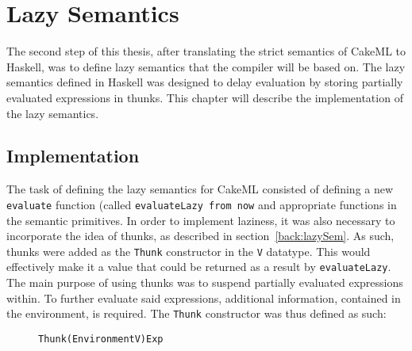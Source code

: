 \chapter{Lazy Semantics}
The second step of this thesis, after translating the strict semantics of CakeML
to Haskell, was to define lazy semantics that the compiler will be based on.
The lazy semantics defined in Haskell was designed to delay evaluation by
storing partially evaluated expressions in thunks. This chapter will describe
the implementation of the lazy semantics.

\section{Implementation}

The task of defining the lazy semantics for CakeML consisted of defining a new
\texttt{evaluate} function (called \texttt{evaluateLazy from now} and
appropriate functions in the semantic primitives.
In order to implement laziness, it was also necessary to incorporate the idea of
thunks, as described in section~\ref{back:lazySem}. As such, thunks were added
as the \texttt{Thunk} constructor in the \texttt{V} datatype. This would
effectively make it a value that could be returned as a result by
\texttt{evaluateLazy}. The main purpose of using thunks was to suspend partially
evaluated expressions within. To further evaluate said expressions, additional
information, contained in the environment, is required.
The \texttt{Thunk} constructor was thus defined as such:

\begin{figure}[H]
\begin{alltt}
  Thunk (Environment V) Exp
\end{alltt}
\end{figure}

